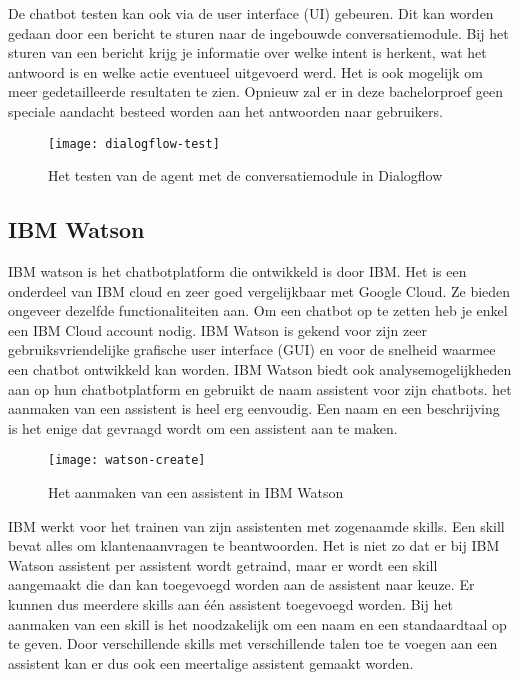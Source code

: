 De chatbot testen kan ook via de user interface (UI) gebeuren. Dit kan worden gedaan door een bericht te sturen naar de ingebouwde conversatiemodule. Bij het sturen van een bericht krijg je informatie over welke intent is herkent, wat het antwoord is en welke actie eventueel uitgevoerd werd. Het is ook mogelijk om meer gedetailleerde resultaten te zien. Opnieuw zal er in deze bachelorproef geen speciale aandacht besteed worden aan het antwoorden naar gebruikers.

\begin{figure}[H]
    \label{fig:dialogflow-test}
    \centering
    \texttt{[image: dialogflow-test]}
    \caption{Het testen van de agent met de conversatiemodule in Dialogflow}
\end{figure}

\subsection{IBM Watson}
\label{subsec:werking-platformen-ibm-watson}

IBM watson is het chatbotplatform die ontwikkeld is door IBM. Het is een onderdeel van IBM cloud en zeer goed vergelijkbaar met Google Cloud. Ze bieden ongeveer dezelfde functionaliteiten aan. Om een chatbot op te zetten heb je enkel een IBM Cloud account nodig. IBM Watson is gekend voor zijn zeer gebruiksvriendelijke grafische user interface (GUI) en voor de snelheid waarmee een chatbot ontwikkeld kan worden. IBM Watson biedt ook analysemogelijkheden aan op hun chatbotplatform en gebruikt de naam assistent voor zijn chatbots. het aanmaken van een assistent is heel erg eenvoudig. Een naam en een beschrijving is het enige dat gevraagd wordt om een assistent aan te maken.

\begin{figure}[H]
    \label{fig:watson-create}
    \centering
    \texttt{[image: watson-create]}
    \caption{Het aanmaken van een assistent in IBM Watson}
\end{figure}

IBM werkt voor het trainen van zijn assistenten met zogenaamde skills. Een skill bevat alles om klantenaanvragen te beantwoorden. Het is niet zo dat er bij IBM Watson assistent per assistent wordt getraind, maar er wordt een skill aangemaakt die dan kan toegevoegd worden aan de assistent naar keuze. Er kunnen dus meerdere skills aan één assistent toegevoegd worden. Bij het aanmaken van een skill is het noodzakelijk om een naam en een standaardtaal op te geven. Door verschillende skills met verschillende talen toe te voegen aan een assistent kan er dus ook een meertalige assistent gemaakt worden.

